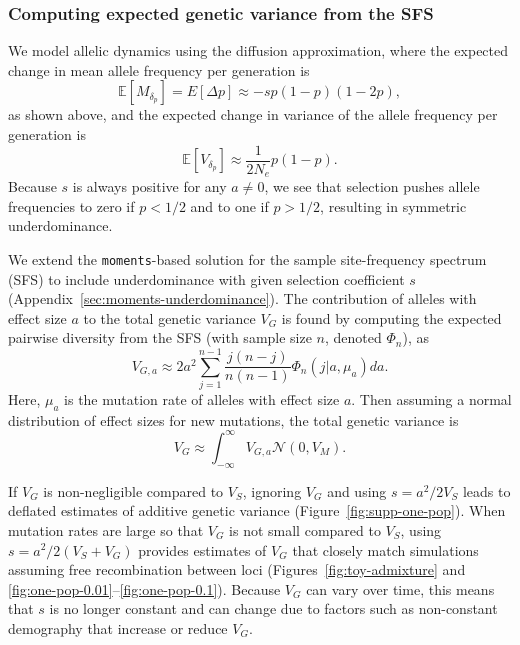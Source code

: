 \documentclass{article}
\newcommand{\E}{\mathbb{E}}
\newcommand{\moments}{\texttt{moments}\xspace}
\begin{document}
\subsubsection*{Computing expected genetic variance from the SFS}

We model allelic dynamics using the diffusion approximation, where the expected
change in mean allele frequency per generation is
\[\E[M_{\delta_p}] = E[\Delta p] \approx -s p(1-p)(1-2p),\]
as shown above, and the expected change in variance of the allele frequency per
generation is
\[\E[V_{\delta_p}] \approx \frac{1}{2N_e}p(1-p).\]
Because $s$ is always positive for any $a\not=0$, we see that selection pushes
allele frequencies to zero if $p<1/2$ and to one if $p>1/2$, resulting in
symmetric underdominance.

We extend the \moments-based solution for the sample site-frequency spectrum
(SFS) \citep{jouganous2017inferring} to include underdominance with given
selection coefficient $s$ (Appendix~\ref{sec:moments-underdominance}). The
contribution of alleles with effect size $a$ to the total genetic variance
$V_G$ is found by computing the expected pairwise diversity from the SFS (with
sample size $n$, denoted $\Phi_n$), as \[V_{G,a} \approx 2a^2\sum_{j=1}^{n-1}
\frac{j(n-j)}{n(n-1)} \Phi_n(j|a,\mu_a) da.\] Here, $\mu_a$ is the mutation
rate of alleles with effect size $a$. Then assuming a normal distribution of
effect sizes for new mutations, the total genetic variance is \[V_G \approx
\int_{-\infty}^\infty V_{G,a}\mathcal{N}(0,V_M).\]

If $V_G$ is non-negligible compared to $V_S$, ignoring $V_G$ and using
$s=a^2/2V_S$ leads to deflated estimates of additive genetic variance
(Figure~\ref{fig:supp-one-pop}). When mutation rates are large so that $V_G$ is
not small compared to $V_S$, using $s=a^2/2(V_S+V_G)$ provides estimates of
$V_G$ that closely match simulations assuming free recombination between loci
(Figures~\ref{fig:toy-admixture} and
\ref{fig:one-pop-0.01}--\ref{fig:one-pop-0.1}). Because $V_G$ can vary over
time, this means that $s$ is no longer constant and can change due to factors
such as non-constant demography that increase or reduce $V_G$.
\end{document}
